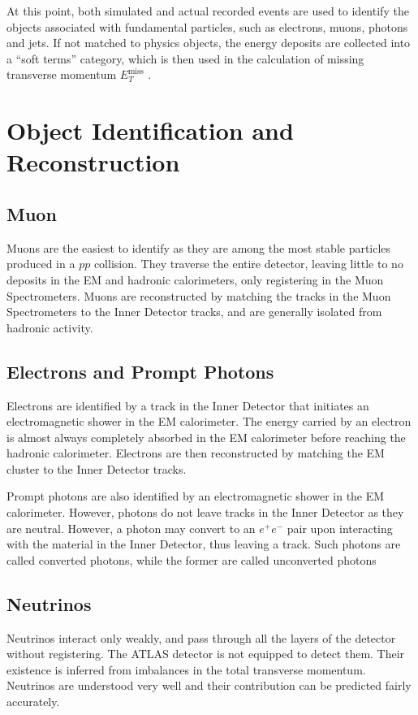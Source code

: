 \documentclass[11pt,a4paper,openright,twoside]{report}
\newcommand{\met}{$E_T^{\mathrm{miss}}$ }
\begin{document}
At this point, both simulated and actual recorded events are used to identify the objects associated with fundamental particles, such as electrons, muons, photons and jets. If not matched to physics objects, the energy deposits are collected into a ``soft terms'' category, which is then used in the calculation of missing transverse momentum \met.

\section{Object Identification and Reconstruction}

\subsection{Muon}
Muons are the easiest to identify as they are among the most stable particles produced in a $pp$ collision. They traverse the entire detector, leaving little to no deposits in the EM and hadronic calorimeters, only registering in the Muon Spectrometers. Muons are reconstructed by matching the tracks in the Muon Spectrometers to the Inner Detector tracks, and are generally isolated from hadronic activity.

\subsection{Electrons and Prompt Photons}
Electrons are identified by a track in the Inner Detector that initiates an electromagnetic shower in the EM calorimeter. The energy carried by an electron is almost always completely absorbed in the EM calorimeter before reaching the hadronic calorimeter. Electrons are then reconstructed by matching the EM cluster to the Inner Detector tracks.

Prompt photons are also identified by an electromagnetic shower in the EM calorimeter. However, photons do not leave tracks in the Inner Detector as they are neutral. However, a photon may convert to an $e^+e^-$ pair upon interacting with the material in the Inner Detector, thus leaving a track. Such photons are called converted photons, while the former are called unconverted photons

\subsection{Neutrinos}
Neutrinos interact only weakly, and pass through all the layers of the detector without registering. The ATLAS detector is not equipped to detect them. Their existence is inferred from imbalances in the total transverse momentum. Neutrinos are understood very well and their contribution can be predicted fairly accurately.
\end{document}
